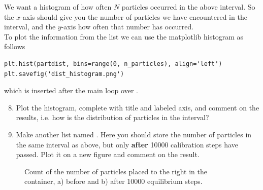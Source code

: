 \documentclass{article}
\begin{document}
We want a histogram of how often $N$ particles occurred in the above
interval. So the $x$-axis should give you the number of particles we have
encountered in the interval, and the $y$-axis how often that number
has occurred.\\

To plot the information from the list we can use the matplotlib histogram as follows

\begin{lstlisting}
plt.hist(partdist, bins=range(0, n_particles), align='left')
plt.savefig('dist_histogram.png')
\end{lstlisting}

which is inserted after the main loop over .

\begin{enumerate}
  \setcounter{enumi}{7}
  \item Plot the histogram, complete with title and labeled axis, and comment on the results, i.e. how is the
    distribution of particles in the interval?

  \item Make another list named . Here you should store the
    number of particles in the same interval as above, but only {\bf after}
    10000 calibration steps have passed. Plot it on a new figure and comment
    on the result.

\end{enumerate}

\begin{figure}[htb]
  \label{fig:partdist}
  \caption{
     Count of the number of particles placed to the right in the container, a) before and b) after 10000 equilibrium steps.
  }
\end{figure}



\end{document}
